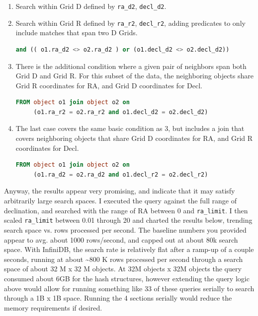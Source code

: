 \documentclass[DM,lsstdraft,toc]{lsstdoc}
\begin{document}
\begin{enumerate}
\def\labelenumi{\arabic{enumi}.}
\item
  Search within Grid D defined by \texttt{ra\_d2}, \texttt{decl\_d2}.~
\item
  Search within Grid R defined by \texttt{ra\_r2}, \texttt{decl\_r2},
  adding predicates to only include matches that span two D Grids.

\begin{lstlisting}[language=SQL]
and (( o1.ra_d2 <> o2.ra_d2 ) or (o1.decl_d2 <> o2.decl_d2))
\end{lstlisting}
\item
  There is the additional condition where a given pair of neighbors span
  both Grid D and Grid R. For this subset of the data, the neighboring
  objects share Grid R coordinates for RA, and Grid D coordinates for
  Decl.

\begin{lstlisting}[language=SQL]
FROM object o1 join object o2 on
     (o1.ra_r2 = o2.ra_r2 and o1.decl_d2 = o2.decl_d2)
\end{lstlisting}
\item
  The last case covers the same basic condition as 3, but includes a
  join that covers neighboring objects that share Grid D coordinates for
  RA, and Grid R coordinates for Decl.

\begin{lstlisting}[language=SQL]
FROM object o1 join object o2 on
     (o1.ra_d2 = o2.ra_d2 and o1.decl_r2 = o2.decl_r2)
\end{lstlisting}
\end{enumerate}

Anyway, the results appear very promising, and indicate that it may
satisfy arbitrarily large search spaces. I executed the query against
the full range of declination, and searched with the range of RA between
0 and \texttt{ra\_limit}. I then scaled \texttt{ra\_limit} between 0.01
through 20 and charted the results below, trending search space vs. rows
processed per second. The baseline numbers you provided appear to avg.
about 1000 rows/second, and capped out at about 80k search space. With
InfiniDB, the search rate is relatively flat after a ramp-up of a couple
seconds, running at about \textasciitilde{}800 K rows processed per
second through a search space of about 32 M x 32 M objects. At 32M
objects x 32M objects the query consumed about 6GB for the hash
structures, however extending the query logic above would allow for
running something like 33 of these queries serially to search through a
1B x 1B space. Running the 4 sections serially would reduce the memory
requirements if desired.
\end{document}
